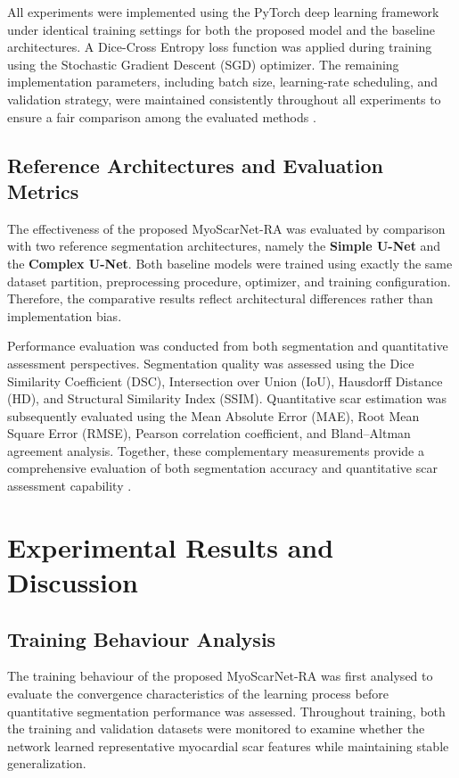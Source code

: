 All experiments were implemented using the PyTorch deep learning framework under identical training settings for both the proposed model and the baseline architectures. A Dice-Cross Entropy loss function was applied during training using the Stochastic Gradient Descent (SGD) optimizer. The remaining implementation parameters, including batch size, learning-rate scheduling, and validation strategy, were maintained consistently throughout all experiments to ensure a fair comparison among the evaluated methods \citep{Riandini2026Access}.

\subsection{Reference Architectures and Evaluation Metrics}
\label{subsec:ch6-reference-models}

The effectiveness of the proposed MyoScarNet-RA was evaluated by comparison with two reference segmentation architectures, namely the \textbf{Simple U-Net} and the \textbf{Complex U-Net}. Both baseline models were trained using exactly the same dataset partition, preprocessing procedure, optimizer, and training configuration. Therefore, the comparative results reflect architectural differences rather than implementation bias.

Performance evaluation was conducted from both segmentation and quantitative assessment perspectives. Segmentation quality was assessed using the Dice Similarity Coefficient (DSC), Intersection over Union (IoU), Hausdorff Distance (HD), and Structural Similarity Index (SSIM). Quantitative scar estimation was subsequently evaluated using the Mean Absolute Error (MAE), Root Mean Square Error (RMSE), Pearson correlation coefficient, and Bland--Altman agreement analysis. Together, these complementary measurements provide a comprehensive evaluation of both segmentation accuracy and quantitative scar assessment capability \citep{Riandini2026Access}.

\section{Experimental Results and Discussion}
\label{sec:ch6-results}

\subsection{Training Behaviour Analysis}
\label{subsec:ch6-training}

The training behaviour of the proposed MyoScarNet-RA was first analysed to evaluate the convergence characteristics of the learning process before quantitative segmentation performance was assessed. Throughout training, both the training and validation datasets were monitored to examine whether the network learned representative myocardial scar features while maintaining stable generalization.

